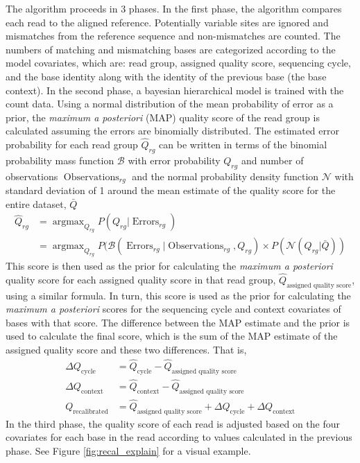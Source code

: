 The algorithm proceeds in 3 phases.
In the first phase, the algorithm compares each read to the aligned reference. Potentially variable sites are ignored and mismatches from the reference sequence and non-mismatches are counted. The numbers of matching and mismatching bases are categorized according to the model covariates, which are: read group, assigned quality score, sequencing cycle, and the base identity along with the identity of the previous base (the base context).
In the second phase, a bayesian hierarchical model is trained with the count data. Using a normal distribution of the mean probability of error as a prior, the \textit{maximum a posteriori} (MAP) quality score of the read group is calculated assuming the errors are binomially distributed. The estimated error probability for each read group $\hat{Q}_{rg}$ can be written in terms of the binomial probability mass function $\mathcal{B}$ with error probability $Q_{rg}$ and number of observations $\operatorname{Observations}_{rg}$ and the normal probability density function $\mathcal{N}$ with standard deviation of 1 around the mean estimate of the quality score for the entire dataset, $\bar{Q}$
\begin{align}
\hat{Q}_{rg} &= \operatorname{argmax}_{Q_{rg}} P(Q_{rg}|\operatorname{Errors}_{rg}) \\
&= \operatorname{argmax}_{Q_{rg}} P(\mathcal{B}(\operatorname{Errors}_{rg} | \operatorname{Observations}_{rg}, Q_{rg}) \times P(\mathcal{N}(Q_{rg} | \bar{Q}))
\end{align}
This score is then used as the prior for calculating the \textit{maximum a posteriori} quality score for each assigned quality score in that read group, $\hat{Q}_{\operatorname{assigned\:quality\:score}}$, using a similar formula.
In turn, this score is used as the prior for calculating the \textit{maximum a posteriori} scores for the sequencing cycle and context covariates of bases with that score. The difference between the MAP estimate and the prior is used to calculate the final score, which is the sum of the MAP estimate of the assigned quality score and these two differences. That is,
\begin{align}
\Delta Q_{\operatorname{cycle}} &= \hat{Q}_{\operatorname{cycle}} - \hat{Q}_{\operatorname{assigned\:quality\:score}} \\
\Delta Q_{\operatorname{context}} &= \hat{Q}_{\operatorname{context}} - \hat{Q}_{\operatorname{assigned\:quality\:score}} \\
Q_{\operatorname{recalibrated}} &= \hat{Q}_{\operatorname{assigned\:quality\:score}} + \Delta Q_{\operatorname{cycle}} + \Delta Q_{\operatorname{context}}
\end{align}
In the third phase, the quality score of each read is adjusted based on the four covariates for each base in the read according to values calculated in the previous phase. See Figure \ref{fig:recal_explain} for a visual example.

